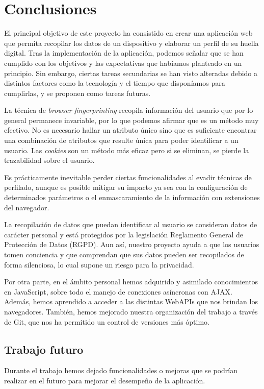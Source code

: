\chapter{Conclusiones}
El principal objetivo de este proyecto ha consistido en crear una aplicación web que permita recopilar los datos de un dispositivo y elaborar un perfil de su huella digital. Tras la implementación de la aplicación, podemos señalar que se han cumplido con los objetivos y las expectativas que habíamos planteado en un principio. Sin embargo, ciertas tareas secundarias se han visto alteradas debido a distintos factores como la tecnología y el tiempo que disponíamos para cumplirlas, y se proponen como tareas futuras. \par

La técnica de \textit{browser fingerprinting} recopila información del usuario que por lo general permanece invariable, por lo que podemos afirmar que es un método muy efectivo. No es necesario hallar un atributo único sino que es suficiente encontrar una combinación de atributos que resulte única para poder identificar a un usuario. Las \textit{cookies} son un método más eficaz pero si se eliminan, se pierde la trazabilidad sobre el usuario. \par 

Es prácticamente inevitable perder ciertas funcionalidades al evadir técnicas de perfilado, aunque es posible mitigar su impacto ya sea con la configuración de determinados parámetros o el enmascaramiento de la información con extensiones del navegador. \par 

La recopilación de datos que puedan identificar al usuario se consideran datos de carácter personal y está protegidos por la legislación Reglamento General de Protección de Datos (RGPD). Aun así, nuestro proyecto ayuda a que los usuarios tomen conciencia y que comprendan que sus datos pueden ser recopilados de forma silenciosa, lo cual supone un riesgo para la privacidad. \par

Por otra parte, en el ámbito personal hemos adquirido y asimilado conocimientos en JavaScript, sobre todo el manejo de conexiones asíncronas con AJAX. Además, hemos aprendido a acceder a las distintas WebAPIs que nos brindan los navegadores.
También, hemos mejorado nuestra organización del trabajo a través de Git, que nos ha permitido un control de versiones más óptimo. \par

\section{Trabajo futuro}
Durante el trabajo hemos dejado funcionalidades o mejoras que se podrían realizar en el futuro para mejorar el desempeño de la aplicación.
